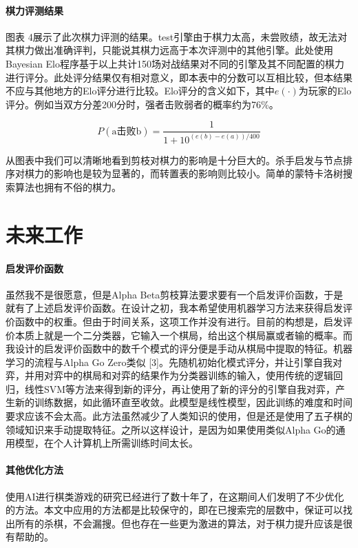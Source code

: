 \documentclass{ctexart}
\begin{document}
\paragraph{棋力评测结果} 图表 4展示了此次棋力评测的结果。test引擎由于棋力太高，未尝败绩，故无法对其棋力做出准确评判，只能说其棋力远高于本次评测中的其他引擎。此处使用Bayesian Elo程序\cite{WEBSITE:BayesianELO}基于以上共计150场对战结果对不同的引擎及其不同配置的棋力进行评分。此处评分结果仅有相对意义，即本表中的分数可以互相比较，但本结果不应与其他地方的Elo评分进行比较。Elo评分的含义如下，其中$e(\cdot)$为玩家的Elo评分。例如当双方分差200分时，强者击败弱者的概率约为76\%。

\begin{equation}
    P(\text{a击败b})=\frac{1}{1+10^{(e(b)-e(a))/400}}
\end{equation}

从图表中我们可以清晰地看到剪枝对棋力的影响是十分巨大的。杀手启发与节点排序对棋力的影响也是较为显著的，而转置表的影响则比较小。简单的蒙特卡洛树搜索算法也拥有不俗的棋力。

\section{未来工作}
\paragraph{启发评价函数} 虽然我不是很愿意，但是Alpha Beta剪枝算法要求要有一个启发评价函数，于是就有了上述启发评价函数。在设计之初，我本希望使用机器学习方法来获得启发评价函数中的权重。但由于时间关系，这项工作并没有进行。目前的构想是，启发评价本质上就是一个二分类器，它输入一个棋局，给出这个棋局赢或者输的概率。而我设计的启发评价函数中的数千个模式的评分便是手动从棋局中提取的特征。机器学习的流程与Alpha Go Zero类似 [3]。先随机初始化模式评分，并让引擎自我对弈，并用对弈中的棋局和对弈的结果作为分类器训练的输入，使用传统的逻辑回归，线性SVM等方法来得到新的评分，再让使用了新的评分的引擎自我对弈，产生新的训练数据，如此循环直至收敛。此模型是线性模型，因此训练的难度和时间要求应该不会太高。此方法虽然减少了人类知识的使用，但是还是使用了五子棋的领域知识来手动提取特征。之所以这样设计，是因为如果使用类似Alpha Go的通用模型，在个人计算机上所需训练时间太长。

\paragraph{其他优化方法} 使用AI进行棋类游戏的研究已经进行了数十年了，在这期间人们发明了不少优化的方法。本文中应用的方法都是比较保守的，即在已搜索完的层数中，保证可以找出所有的杀棋，不会漏搜。但也存在一些更为激进的算法，对于棋力提升应该是很有帮助的。
\end{document}
